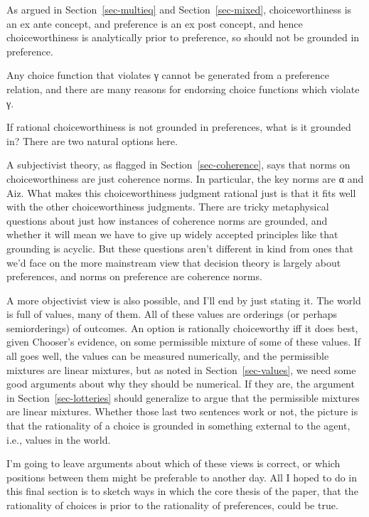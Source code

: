 \documentclass[
  10.5pt,
  twoside]{article}
\providecommand{\tightlist}{%
  \setlength{\itemsep}{0pt}\setlength{\parskip}{0pt}}
\let\oldenumerate\enumerate
\let\endoldenumerate\endenumerate
\renewenvironment{enumerate}
  {\vskip 5pt\oldenumerate}
  {\endoldenumerate\vskip 5pt}
\begin{document}
\begin{enumerate}
\def\labelenumi{\arabic{enumi}.}
\tightlist
\item
  As argued in Section~\ref{sec-multieq} and Section~\ref{sec-mixed},
  choiceworthiness is an ex ante concept, and preference is an ex post
  concept, and hence choiceworthiness is analytically prior to
  preference, so should not be grounded in preference.
\item
  Any choice function that violates γ cannot be generated from a
  preference relation, and there are many reasons for endorsing choice
  functions which violate γ.
\end{enumerate}

If rational choiceworthiness is not grounded in preferences, what is it
grounded in? There are two natural options here.

A subjectivist theory, as flagged in Section~\ref{sec-coherence}, says
that norms on choiceworthiness are just coherence norms. In particular,
the key norms are α and Aiz. What makes this choiceworthiness judgment
rational just is that it fits well with the other choiceworthiness
judgments. There are tricky metaphysical questions about just how
instances of coherence norms are grounded, and whether it will mean we
have to give up widely accepted principles like that grounding is
acyclic. But these questions aren't different in kind from ones that
we'd face on the more mainstream view that decision theory is largely
about preferences, and norms on preference are coherence norms.

A more objectivist view is also possible, and I'll end by just stating
it. The world is full of values, many of them. All of these values are
orderings (or perhaps semiorderings) of outcomes. An option is
rationally choiceworthy iff it does best, given Chooser's evidence, on
some permissible mixture of some of these values. If all goes well, the
values can be measured numerically, and the permissible mixtures are
linear mixtures, but as noted in Section~\ref{sec-values}, we need some
good arguments about why they should be numerical. If they are, the
argument in Section~\ref{sec-lotteries} should generalize to argue that
the permissible mixtures are linear mixtures. Whether those last two
sentences work or not, the picture is that the rationality of a choice
is grounded in something external to the agent, i.e., values in the
world.

I'm going to leave arguments about which of these views is correct, or
which positions between them might be preferable to another day. All I
hoped to do in this final section is to sketch ways in which the core
thesis of the paper, that the rationality of choices is prior to the
rationality of preferences, could be true.
\end{document}
